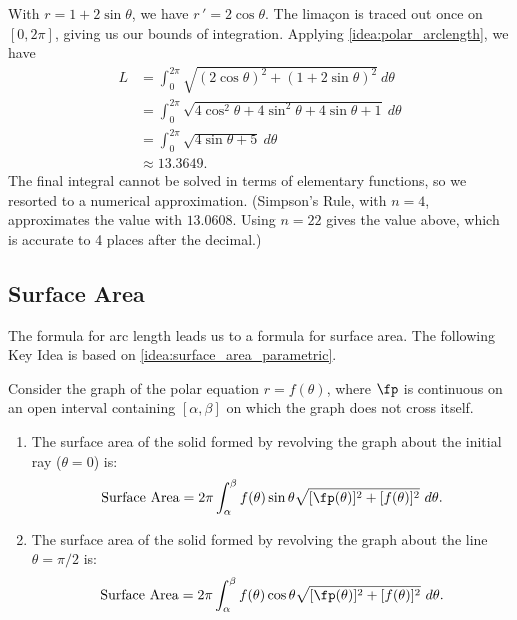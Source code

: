 {With $r=1+2\sin\theta$, we have $r\,' = 2\cos\theta$. The lima\c con is traced out once on $[0,2\pi]$, giving us our bounds of integration. Applying \autoref{idea:polar_arclength}, we have
\begin{align*}
	L
	&= \int_0^{2\pi} \sqrt{(2\cos\theta)^2+(1+2\sin\theta)^2}\ d\theta \\
	&=	\int_0^{2\pi} \sqrt{4\cos^2\theta+4\sin^2\theta +4\sin\theta+1}\ d\theta\\
	&=	\int_0^{2\pi} \sqrt{4\sin\theta+5}\ d\theta\\
	&\approx 13.3649.
\end{align*}
%
%
The final integral cannot be solved in terms of elementary functions, so we resorted to a numerical approximation. (Simpson's Rule, with $n=4$, approximates the value with $13.0608$. Using $n=22$ gives the value above, which is accurate to 4 places after the decimal.)}

\subsection{Surface Area}

The formula for arc length leads us to a formula for surface area. The following Key Idea is based on \autoref{idea:surface_area_parametric}.

{Consider the graph of the polar equation $r=f(\theta)$, where $\fp$ is continuous on an open interval containing $[\alpha,\beta]$ on which the graph does not cross itself.
\begin{enumerate}
	\item The surface area of the solid formed by revolving the graph about the initial ray ($\theta=0$) is:
	\[\text{Surface Area} = 2\pi\int_\alpha^\beta f(\theta)\sin\theta\sqrt{[\fp(\theta)]^2+[f(\theta)]^2}\ d\theta.\]
	\item The surface area of the solid formed by revolving the graph about the line $\theta=\pi/2$ is:
	\[\text{Surface Area} = 2\pi\int_\alpha^\beta f(\theta)\cos\theta\sqrt{[\fp(\theta)]^2+[f(\theta)]^2}\ d\theta.\]
\end{enumerate}}

